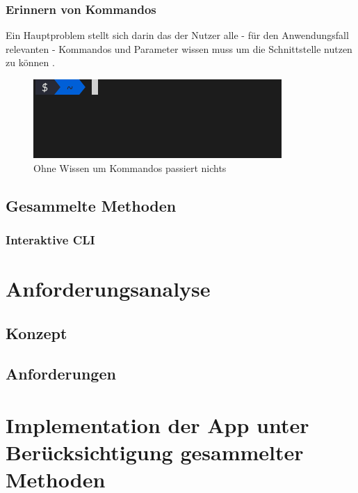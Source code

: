 \documentclass[oneside,bibliography=totocnumbered,BCOR=5mm]{scrbook}
\begin{document}
\subsection{Erinnern von Kommandos}

Ein Hauptproblem stellt sich darin das der Nutzer alle - für den Anwendungsfall
relevanten - Kommandos und Parameter wissen muss um die Schnittstelle nutzen zu
können \parencite{Raskin_2008}.

\begin{figure}
  \centering
  \includegraphics[scale=0.5]{empty-prompt.png}
  \caption{Ohne Wissen um Kommandos passiert nichts}
\end{figure}


\section{Gesammelte Methoden}

\subsection{Interaktive CLI}
\label{chap:interactive}


\chapter{Anforderungsanalyse}
\section{Konzept}
\section{Anforderungen}

\chapter{Implementation der App unter Berücksichtigung gesammelter Methoden}
\end{document}
